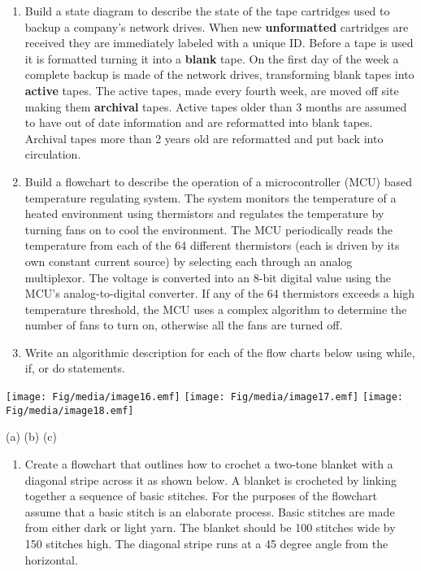\begin{itemize}
  \begin{enumerate}
  \def\labelenumi{\arabic{enumi}.}
  \item
    Build a state diagram to describe the state of the tape cartridges
    used to backup a company's network drives. When new
    \textbf{unformatted} cartridges are received they are immediately
    labeled with a unique ID. Before a tape is used it is formatted
    turning it into a \textbf{blank} tape. On the first day of the week
    a complete backup is made of the network drives, transforming blank
    tapes into \textbf{active} tapes. The active tapes, made every
    fourth week, are moved off site making them \textbf{archival} tapes.
    Active tapes older than 3 months are assumed to have out of date
    information and are reformatted into blank tapes. Archival tapes
    more than 2 years old are reformatted and put back into circulation.
  \item
    Build a flowchart to describe the operation of a microcontroller
    (MCU) based temperature regulating system. The system monitors the
    temperature of a heated environment using thermistors and regulates
    the temperature by turning fans on to cool the environment. The MCU
    periodically reads the temperature from each of the 64 different
    thermistors (each is driven by its own constant current source) by
    selecting each through an analog multiplexor. The voltage is
    converted into an 8-bit digital value using the MCU's
    analog-to-digital converter. If any of the 64 thermistors exceeds a
    high temperature threshold, the MCU uses a complex algorithm to
    determine the number of fans to turn on, otherwise all the fans are
    turned off.
  \item
    Write an algorithmic description for each of the flow charts below
    using while, if, or do statements.
  \end{enumerate}
\end{itemize}

\texttt{[image: Fig/media/image16.emf]}
\texttt{[image: Fig/media/image17.emf]}
\texttt{[image: Fig/media/image18.emf]}

(a) (b) (c)

\begin{enumerate}
\def\labelenumi{\arabic{enumi}.}
\setcounter{enumi}{3}
\item
  Create a flowchart that outlines how to crochet a two-tone blanket
  with a diagonal stripe across it as shown below. A blanket is
  crocheted by linking together a sequence of basic stitches. For the
  purposes of the flowchart assume that a basic stitch is an elaborate
  process. Basic stitches are made from either dark or light yarn. The
  blanket should be 100 stitches wide by 150 stitches high. The diagonal
  stripe runs at a 45 degree angle from the horizontal.
\end{enumerate}

